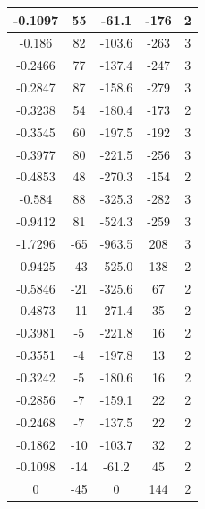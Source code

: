 \documentclass[14pt, a4paper,reqno]{article}
\begin{document}
\begin{center}
\begin{tabular}{|c|c|c|c|c|}
            -0.1097  & 55             & -61.1	& -176            & 2  \\ \hline
            -0.186   & 82             & -103.6	& -263            & 3  \\ \hline
            -0.2466  & 77             & -137.4	& -247            & 3  \\ \hline
            -0.2847  & 87             & -158.6	& -279            & 3  \\ \hline
            -0.3238  & 54             & -180.4	& -173            & 2  \\ \hline
            -0.3545  & 60             & -197.5	& -192            & 3  \\ \hline
            -0.3977  & 80             & -221.5	& -256            & 3  \\ \hline
            -0.4853  & 48             & -270.3	& -154            & 2  \\ \hline
            -0.584   & 88             & -325.3	& -282            & 3  \\ \hline
            -0.9412  & 81             & -524.3	& -259            & 3  \\ \hline
            -1.7296  & -65            & -963.5	& 208             & 3  \\ \hline
            -0.9425  & -43            & -525.0	& 138             & 2  \\ \hline
            -0.5846  & -21            & -325.6	& 67              & 2  \\ \hline
            -0.4873  & -11            & -271.4	& 35              & 2  \\ \hline
            -0.3981  & -5             & -221.8	& 16              & 2  \\ \hline
            -0.3551  & -4             & -197.8	& 13              & 2  \\ \hline
            -0.3242  & -5             & -180.6	& 16              & 2  \\ \hline
            -0.2856  & -7             & -159.1	& 22              & 2  \\ \hline
            -0.2468  & -7             & -137.5	& 22              & 2  \\ \hline
            -0.1862  & -10            & -103.7	& 32              & 2  \\ \hline
            -0.1098  & -14            & -61.2	& 45              & 2  \\ \hline
            0        & -45            & 0	    & 144             & 2  \\ \hline

\end{tabular}
\end{center}
\end{document}
